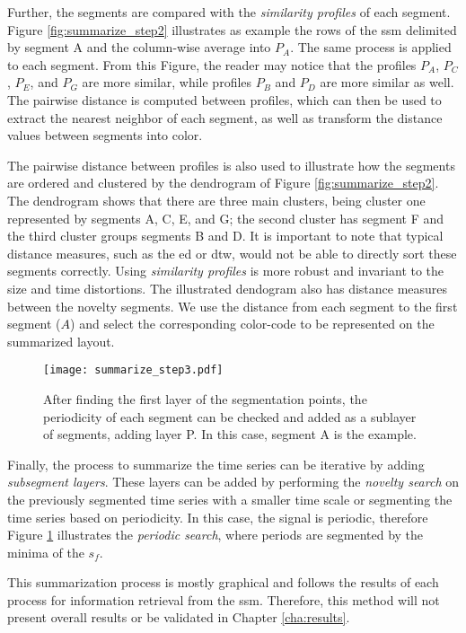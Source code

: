 Further, the segments are compared with the \textit{similarity profiles} of each segment. Figure \ref{fig:summarize_step2} illustrates as example the rows of the \gls{ssm} delimited by segment A and the column-wise average into $P_A$. The same process is applied to each segment. From this Figure, the reader may notice that the profiles $P_A$, $P_C$, $P_E$, and $P_G$ are more similar, while profiles $P_B$ and $P_D$ are more similar as well. The pairwise distance is computed between profiles, which can then be used to extract the nearest neighbor of each segment, as well as transform the distance values between segments into color. 
\par
The pairwise distance between profiles is also used to illustrate how the segments are ordered and clustered by the dendrogram of Figure \ref{fig:summarize_step2}. The dendrogram shows that there are three main clusters, being cluster one represented by segments A, C, E, and G; the second cluster has segment F and the third cluster groups segments B and D. It is important to note that typical distance measures, such as the \gls{ed} or \gls{dtw}, would not be able to directly sort these segments correctly. Using \textit{similarity profiles} is more robust and invariant to the size and time distortions. The illustrated dendogram also has distance measures between the novelty segments. We use the distance from each segment to the first segment ($A$) and select the corresponding color-code to be represented on the summarized layout. 

\begin{figure}[b]
\centering
\texttt{[image: summarize\_step3.pdf]}
\caption{After finding the first layer of the segmentation points, the periodicity of each segment can be checked and added as a sublayer of segments, adding layer P. In this case, segment A is the example.}
\label{fig:summarize_step3}
\end{figure}

Finally, the process to summarize the time series can be iterative by adding \textit{subsegment layers}. These layers can be added by performing the \textit{novelty search} on the previously segmented time series with a smaller time scale or segmenting the time series based on periodicity. In this case, the signal is periodic, therefore Figure \ref{fig:summarize_step3} illustrates the \textit{periodic search}, where periods are segmented by the minima of the $s_f$.
\par
This summarization process is mostly graphical and follows the results of each process for information retrieval from the \gls{ssm}. Therefore, this method will not present overall results or be validated in Chapter \ref{cha:results}.
